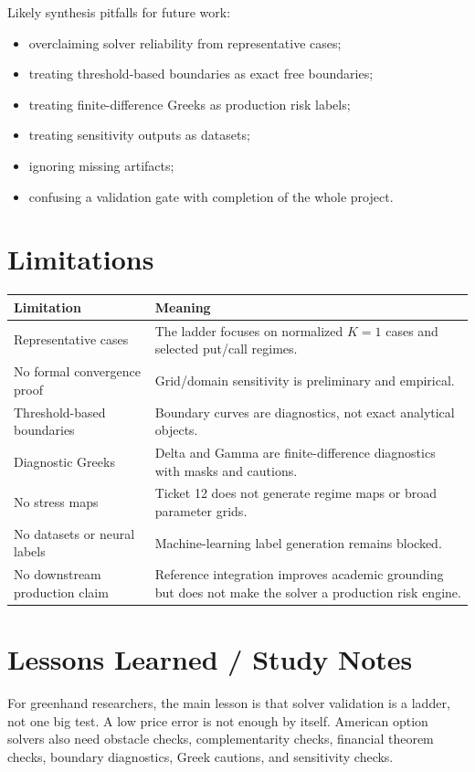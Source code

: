 \documentclass[11pt,a4paper]{article}
\begin{document}
Likely synthesis pitfalls for future work:

\begin{itemize}
  \item overclaiming solver reliability from representative cases;
  \item treating threshold-based boundaries as exact free boundaries;
  \item treating finite-difference Greeks as production risk labels;
  \item treating sensitivity outputs as datasets;
  \item ignoring missing artifacts;
  \item confusing a validation gate with completion of the whole project.
\end{itemize}

\section{Limitations}

\begin{longtable}{L{0.30\textwidth} L{0.60\textwidth}}
\toprule
Limitation & Meaning \\
\midrule
\endhead
Representative cases & The ladder focuses on normalized \(K=1\) cases and selected put/call regimes. \\
No formal convergence proof & Grid/domain sensitivity is preliminary and empirical. \\
Threshold-based boundaries & Boundary curves are diagnostics, not exact analytical objects. \\
Diagnostic Greeks & Delta and Gamma are finite-difference diagnostics with masks and cautions. \\
No stress maps & Ticket 12 does not generate regime maps or broad parameter grids. \\
No datasets or neural labels & Machine-learning label generation remains blocked. \\
No downstream production claim & Reference integration improves academic grounding but does not make the solver a production risk engine. \\
\bottomrule
\end{longtable}

\section{Lessons Learned / Study Notes}

For greenhand researchers, the main lesson is that solver validation is a ladder, not one big test. A low price error is not enough by itself. American option solvers also need obstacle checks, complementarity checks, financial theorem checks, boundary diagnostics, Greek cautions, and sensitivity checks.
\end{document}
